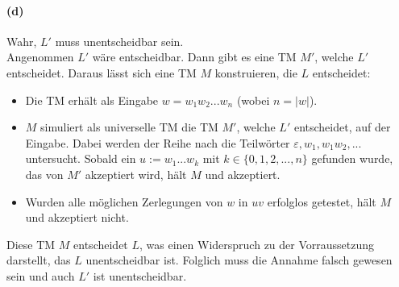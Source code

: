 \paragraph{(d)}
    Wahr, $L'$ muss unentscheidbar sein.\\
	Angenommen $L'$ wäre entscheidbar. Dann gibt es eine TM $M'$, welche $L'$ entscheidet. Daraus lässt sich eine TM $M$ konstruieren, die $L$ entscheidet:
	\begin{itemize}
    	\item Die TM erhält als Eingabe $w = w_1w_2...w_n$ (wobei $n=|w|$).
    	\item $M$ simuliert als universelle TM die TM $M'$, welche $L'$ entscheidet, auf der Eingabe. Dabei werden der Reihe nach die Teilwörter $\varepsilon,w_1,w_1w_2,...$ untersucht. Sobald ein $u:=w_1...w_k$ mit $k \in \{0,1,2,...,n\}$ gefunden wurde, das von $M'$ akzeptiert wird, hält $M$ und akzeptiert.
    	\item Wurden alle möglichen Zerlegungen von $w$ in $uv$ erfolglos getestet, hält $M$ und akzeptiert nicht.
    \end{itemize}
	Diese TM $M$ entscheidet $L$, was einen Widerspruch zu der Vorraussetzung darstellt, das $L$ unentscheidbar ist. Folglich muss die Annahme falsch gewesen sein und auch $L'$ ist unentscheidbar.
	
